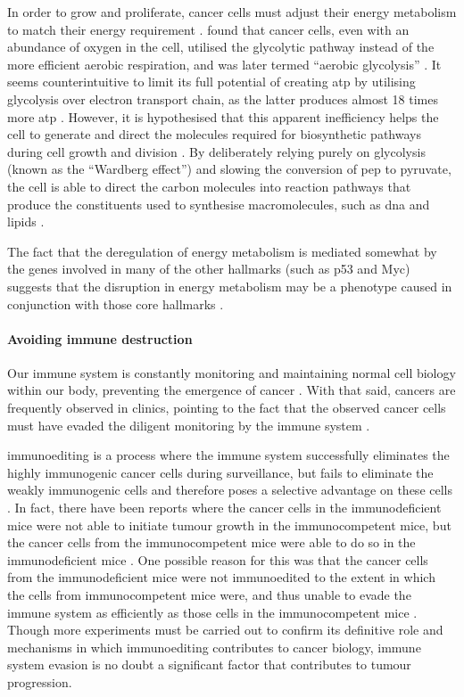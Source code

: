 \noindent
In order to grow and proliferate, cancer cells must adjust their energy metabolism to match their energy requirement \citet{Hanahan2011}.
\citet{Wardburg1956} found that cancer cells, even with an abundance of oxygen in the cell, utilised the glycolytic pathway instead of the more efficient aerobic respiration, and was later termed ``aerobic glycolysis'' \citep{Hanahan2011}.
It seems counterintuitive to limit its full potential of creating \gls{atp} by utilising glycolysis over electron transport chain, as the latter produces almost 18 times more \gls{atp} \citep{Hanahan2011, VanderHeiden2009}.
However, it is hypothesised  that this apparent inefficiency helps the cell to generate and direct the molecules required for biosynthetic pathways during cell growth and division \citep{Cairns2011,VanderHeiden2009}.
By deliberately relying purely on glycolysis (known as the ``Wardberg effect'') and slowing the conversion of \gls{pep} to pyruvate, the cell is able to direct the carbon molecules into reaction pathways that produce the constituents used to synthesise macromolecules, such as \acrshort{dna} and lipids \citep{Cairns2011,VanderHeiden2009}.

The fact that the deregulation of energy metabolism is mediated somewhat by the genes involved in many of the other hallmarks (such as p53 and Myc) suggests that the disruption in energy metabolism may be a phenotype caused in conjunction with those core hallmarks \citep{Hanahan2011}.

\paragraph{Avoiding immune destruction}

\noindent
Our immune system is constantly monitoring and maintaining normal cell biology within our body, preventing the emergence of cancer \citep{Hanahan2011}.
With that said, cancers are frequently observed in clinics, pointing to the fact that the observed cancer cells must have evaded the diligent monitoring by the immune system \citep{Hanahan2011}.

\Gls{immunoediting} is a process where the immune system successfully eliminates the highly immunogenic cancer cells during surveillance, but fails to eliminate the weakly immunogenic cells and therefore poses a selective advantage on these cells \citep{Hanahan2011,Teng2008}.
In fact, there have been reports where the cancer cells in the immunodeficient mice were not able to initiate tumour growth in the immunocompetent mice, but the cancer cells from the immunocompetent mice were able to do so in the immunodeficient mice \citep{Hanahan2011}.
One possible reason for this was that the cancer cells from the immunodeficient mice were not immunoedited to the extent in which the cells from immunocompetent mice were, and thus unable to evade the immune system as efficiently as those cells in the immunocompetent mice \citep{Hanahan2011}.
Though more experiments must be carried out to confirm its definitive role and mechanisms in which immunoediting contributes to cancer biology, immune system evasion is no doubt a significant factor that contributes to tumour progression. \\

